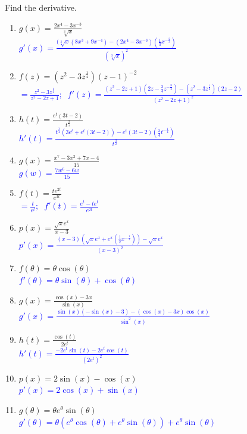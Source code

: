 \documentclass{ximera}
\begin{document}
    
\begin{exercise}
    Find the derivative.
        \begin{enumerate}
            \item $g(x)=\frac{2x^4-3x^{-3}}{\sqrt[3]{x}}$\\
            \textcolor{blue}{ $g'(x)=\frac{(\sqrt[3]{x}(8x^3+9x^{-4})-(2x^4-3x^{-3})(\frac{1}{3}x^{-\frac{2}{3}})}{(\sqrt[3]{x})^2}$}

            \item $f(z)=(z^2-3z^{\frac{1}{4}})(z-1)^{-2}$\\
            \textcolor{blue}{ $=\frac{z^2-3z^{\frac{1}{4}}}{z^2-2z+1};\;\; f'(z)=\frac{(z^2-2z+1)(2z-\frac{3}{4}z^{-\frac{3}{4}})-(z^2-3z^{\frac{1}{4}})(2z-2)}{(z^2-2z+1)^2}$}

            \item $h(t)=\frac{e^t(3t-2)}{t^{\frac{3}{4}}}$\\
            \textcolor{blue}{ $h'(t)=\frac{t^{\frac{3}{4}}(3e^t+e^t(3t-2))-e^t(3t-2)(\frac{3}{4}t^{-\frac{1}{4}})}{t^{\frac{3}{2}}}$}

            \item $g(x)=\frac{x^7-3x^2+7x-4}{15}$ \\
            \textcolor{blue}{ $g(w)=\frac{7w^6-6w}{15}$}

            \item $f(t)=\frac{te^{2t}}{e^{3t}}$\\
            \textcolor{blue}{ $=\frac{t}{e^t};\;\; f'(t)=\frac{e^t-te^t}{e^{2t}}$}

            \item $p(x)=\frac{\sqrt{x}e^x}{x-3}$\\
            \textcolor{blue}{ $p'(x)=\frac{(x-3)(\sqrt{x}e^x+e^x(\frac{1}{2}x^{-\frac{1}{2}}))-\sqrt{x}e^x}{(x-3)^2}$}

            \item $f(\theta)=\theta\cos(\theta)$\\
            \textcolor{blue}{$f'(\theta)=\theta \sin(\theta)+\cos(\theta)$}

            \item $g(x)=\frac{\cos(x)-3x}{\sin(x)}$\\
            \textcolor{blue}{$g'(x)=\frac{\sin(x)(-\sin(x)-3)-(\cos(x)-3x)\cos(x)}{\sin^2(x)}$}

            \item $h(t)=\frac{\cos(t)}{2e^t}$ \\
            \textcolor{blue}{ $h'(t)=\frac{-2e^t\sin(t)-2e^t\cos(t)}{(2e^t)^2}$}

            \item $p(x)=2\sin(x)-\cos(x)$\\
            \textcolor{blue}{ $p'(x)=2\cos(x)+\sin(x)$}

            \item $g(\theta)=\theta e^\theta \sin(\theta)$\\
            \textcolor{blue}{ $g'(\theta)=\theta(e^\theta \cos(\theta)+e^\theta \sin(\theta))+e^\theta\sin(\theta)$\\}
    \end{enumerate}
\end{exercise}
\end{document}
